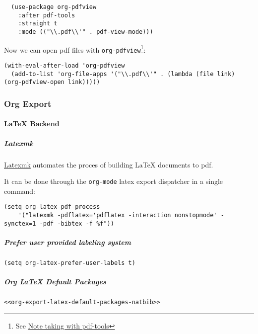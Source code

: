 \documentclass[11pt]{article}
\begin{document}
\begin{verbatim}
  (use-package org-pdfview
    :after pdf-tools
    :straight t
    :mode (("\\.pdf\\'" . pdf-view-mode)))
\end{verbatim}

Now we can open pdf files with \texttt{org-pdfview}\footnote{See \href{https://matt.hackinghistory.ca/2015/11/11/note-taking-with-pdf-tools/}{Note taking with pdf-tools}}:

\begin{verbatim}
(with-eval-after-load 'org-pdfview
  (add-to-list 'org-file-apps '("\\.pdf\\'" . (lambda (file link) (org-pdfview-open link)))))
\end{verbatim}

\subsubsection*{Org Export}
\label{sec:orgb0e8c33}

\paragraph*{\LaTeX{} Backend}
\label{sec:org090f599}

\subparagraph*{Latexmk}
\label{sec:org8b66e7f}

\href{https://ctan.org/pkg/latexmk?lang=en}{Latexmk} automates the proces of building \LaTeX{} documents to pdf.

It can be done through the \texttt{org-mode} latex export dispatcher in a single command:

\begin{verbatim}
(setq org-latex-pdf-process
    '("latexmk -pdflatex='pdflatex -interaction nonstopmode' -synctex=1 -pdf -bibtex -f %f"))
\end{verbatim}

\subparagraph*{Prefer user provided labeling system}
\label{sec:orgcbe3a8c}

\begin{verbatim}
(setq org-latex-prefer-user-labels t)
\end{verbatim}

\subparagraph*{Org \LaTeX{} Default Packages}
\label{sec:org4055c7d}
\begin{verbatim}
<<org-export-latex-default-packages-natbib>>
\end{verbatim}
\end{document}
